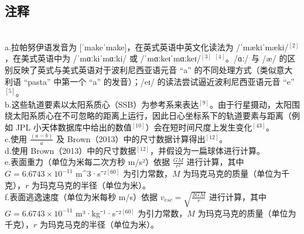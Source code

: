 \subsection{注释}\\
a.拉帕努伊语发音为 [ˈmakeˈmake]，在英式英语中英文化读法为 /ˈmækiˈmæki/$^{[2]}$，在美式英语中为 /ˈmɑːkiˈmɑːki/ 或 /ˈmɑːkeɪˈmɑːkeɪ/$^{[3]}$ $^{[4]}$。/ɑː/ 与 /æ/ 的区别反映了英式与美式英语对于波利尼西亚语元音 “a” 的不同处理方式（类似意大利语 “pasta” 中第一个 “a” 的发音）；/eɪ/ 的读法尝试逼近波利尼西亚语元音 “e”$^{[5]}$。\\
b.这些轨道要素以太阳系质心（SSB）为参考系来表达$^{[9]}$。由于行星摄动，太阳围绕太阳系质心在不可忽略的距离上运行，因此日心坐标系下的轨道要素与距离（例如 JPL 小天体数据库中给出的数值$^{[10]}$）会在短时间尺度上发生变化$^{[43]}$。\\
c.使用 $\frac{(a - b)}{a}$ 及 Brown（2013）中的尺寸数据计算得出$^{[12]}$。\\
d.使用 Brown（2013）中的尺寸数据$^{[12]}$，并假设为一扁球体进行计算。\\
e.表面重力（单位为米每二次方秒 m/s²）依据
$\frac{GM}{r^{2}}$
进行计算，其中$G = 6.6743\times10^{-11}$ m^3\cdot ·s⁻²$^{[60]}$ 为引力常数，$M$ 为玛克马克的质量（单位为千克），$r$ 为玛克马克的半径（单位为米）。\\
f.表面逃逸速度（单位为米每秒 m/s）依据
$v_{esc} = \sqrt{\frac{2GM}{r}}$
进行计算，其中 $G = 6.6743\times10^{-11}$ m³·kg⁻¹·s⁻²$^{[60]}$ 为引力常数，$M$ 为玛克马克的质量（单位为千克），$r$ 为玛克马克的半径（单位为米）。
